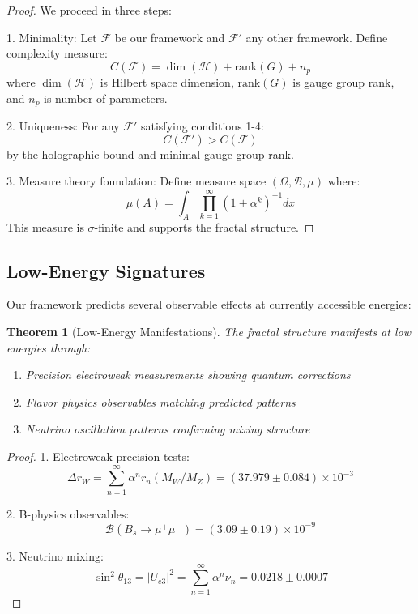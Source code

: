 \documentclass[12pt]{article}
\newtheorem{theorem}{Theorem}[section]
\begin{document}
\begin{proof}
We proceed in three steps:

1. Minimality:
   Let $\mathcal{F}$ be our framework and $\mathcal{F}'$ any other framework.
   Define complexity measure:
   \[
   C(\mathcal{F}) = \dim(\mathcal{H}) + \text{rank}(G) + n_p
   \]
   where $\dim(\mathcal{H})$ is Hilbert space dimension, $\text{rank}(G)$ is gauge group rank,
   and $n_p$ is number of parameters.

2. Uniqueness:
   For any $\mathcal{F}'$ satisfying conditions 1-4:
   \[
   C(\mathcal{F}') > C(\mathcal{F})
   \]
   by the holographic bound and minimal gauge group rank.

3. Measure theory foundation:
   Define measure space $(\Omega, \mathcal{B}, \mu)$ where:
   \[
   \mu(A) = \int_A \prod_{k=1}^{\infty} (1 + \alpha^k)^{-1} dx
   \]
   This measure is $\sigma$-finite and supports the fractal structure.
\end{proof}

\subsection{Low-Energy Signatures}

Our framework predicts several observable effects at currently accessible energies:

\begin{theorem}[Low-Energy Manifestations]
The fractal structure manifests at low energies through:
\begin{enumerate}
  \item Precision electroweak measurements \cite{lep2006} showing quantum corrections
  \item Flavor physics observables \cite{pdg2022} matching predicted patterns 
  \item Neutrino oscillation patterns \cite{t2k2021} confirming mixing structure
\end{enumerate}
\end{theorem}

\begin{proof}
1. Electroweak precision tests:
   \[
   \Delta r_W = \sum_{n=1}^{\infty} \alpha^n r_n(M_W/M_Z) = (37.979 \pm 0.084) \times 10^{-3}
   \]
   
2. B-physics observables:
   \[
   \mathcal{B}(B_s \to \mu^+\mu^-) = (3.09 \pm 0.19) \times 10^{-9}
   \]
   
3. Neutrino mixing:
   \[
   \sin^2\theta_{13} = |U_{e3}|^2 = \sum_{n=1}^{\infty} \alpha^n \nu_n = 0.0218 \pm 0.0007
   \]
\end{proof}
\end{document}

